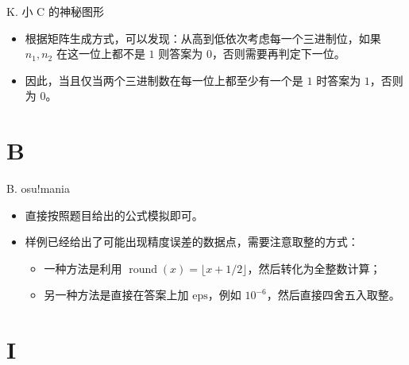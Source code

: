 \documentclass[9pt]{ctexbeamer}
\newcommand{\setParDis}{\setlength{\parskip}{6pt}}
\begin{document}
\begin{frame}
\setParDis

K. 小 C 的神秘图形

\begin{itemize}
	\item 根据矩阵生成方式，可以发现：从高到低依次考虑每一个三进制位，如果 $n_1, n_2$ 在这一位上都不是 $1$ 则答案为 $0$，否则需要再判定下一位。
	\item 因此，当且仅当两个三进制数在每一位上都至少有一个是 $1$ 时答案为 $1$，否则为 $0$。
\end{itemize}

\end{frame}

\section{B}

\begin{frame}
\setParDis

B. osu!mania

\begin{itemize}
	\item 直接按照题目给出的公式模拟即可。
	\item 样例已经给出了可能出现精度误差的数据点，需要注意取整的方式：
	\begin{itemize}
		\item 一种方法是利用 $\operatorname{round}(x) = \lfloor x + 1 / 2 \rfloor$，然后转化为全整数计算；
		\item 另一种方法是直接在答案上加 $\text{eps}$，例如 $10 ^ {-6}$，然后直接四舍五入取整。
	\end{itemize}
\end{itemize}

\end{frame}

\section{I}
\end{document}
